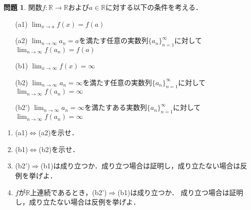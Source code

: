 \documentclass{jsarticle}
\theoremstyle{definition}
\newtheorem{qst}{問題}
\begin{document}
\begin{qst}
関数$f\colon\mathbb{R}\to\mathbb{R}$および$a\in\mathbb{R}$に対する以下の条件を考える．
\begin{itemize}
\item[(a1)]$\displaystyle\lim_{x\to a}f(x)=f(a)$
\item[(a2)]$\displaystyle\lim_{n\to\infty}a_n=a$を満たす任意の実数列$\{a_n\}_{n=1}^\infty$に対して
$\displaystyle\lim_{n\to\infty}f(a_n)=f(a)$
\item[(b1)]$\displaystyle\lim_{x\to\infty}f(x)=\infty$
\item[(b2)]$\displaystyle\lim_{n\to\infty}a_n=\infty$を満たす任意の実数列$\{a_n\}_{n=1}^\infty$に対して
$\displaystyle\lim_{n\to\infty}f(a_n)=\infty$
\item[(b2')]$\displaystyle\lim_{n\to\infty}a_n=\infty$を満たすある実数列$\{a_n\}_{n=1}^\infty$に対して
$\displaystyle\lim_{n\to\infty}f(a_n)=\infty$
\end{itemize}
\begin{enumerate}
\item (a1)$\Leftrightarrow$(a2)を示せ．
\item (b1)$\Leftrightarrow$(b2)を示せ．
\item (b2')$\Rightarrow$(b1)は成り立つか．成り立つ場合は証明し，成り立たない場合は反例を挙げよ．
\item $f$が$\mathbb{R}$上連続であるとき，(b2')$\Rightarrow$(b1)は成り立つか．
成り立つ場合は証明し，成り立たない場合は反例を挙げよ．
\end{enumerate}
\end{qst}
\end{document}
